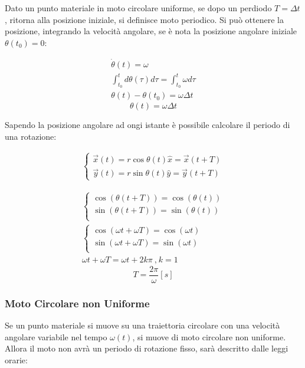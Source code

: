 \documentclass{article}
\numberwithin{equation}{subsection}
\begin{document}
Dato un punto materiale in moto circolare uniforme, se dopo un perdiodo 
$T=\Delta t$, ritorna alla posizione iniziale, si definisce moto 
periodico. Si può ottenere la posizione, integrando la velocità angolare, se è nota la posizione angolare iniziale  
$\theta(t_0) = 0$: 

\begin{gather*}
    \dot\theta(t) = \omega\\
    \int_{t_0}^{t}d\theta(\tau)d\tau=\int_{t_0}^{t}\omega d\tau\\
    \theta(t)-\theta(t_0)=\omega\Delta t
\end{gather*}
\begin{equation}
    \theta(t)=\omega\Delta t
\end{equation}

Sapendo la posizione angolare ad ongi istante è possibile 
calcolare il periodo di una rotazione:

\begin{align*}
    \begin{cases}
        \vec{x}(t)=r\cos\theta(t)\hat{x}=\vec{x}(t+T)\\
        \vec{y}(t)=r\sin\theta(t)\hat{y}=\vec{y}(t+T)
    \end{cases}
\end{align*}

\begin{gather*}
    \begin{cases}
        \cos(\theta(t+T))=\cos(\theta(t))\\
        \sin(\theta(t+T))=\sin(\theta(t))\\
    \end{cases}\\
    \begin{cases}
        \cos(\omega t +\omega T)=\cos(\omega t)\\
        \sin(\omega t + \omega T)=\sin(\omega  t)\\
    \end{cases}\\
    \omega t +\omega T =\omega t + 2k\pi\:\mbox{,}\:k=1
\end{gather*}
\begin{equation}
    T=\displaystyle\frac{2\pi}{\omega}[s]
\end{equation}

\subsubsection{Moto Circolare non Uniforme}
Se un punto materiale si muove su una traiettoria circolare con 
una velocità angolare variabile nel tempo $\omega(t)$, si muove di moto 
circolare non uniforme. Allora il moto non avrà un periodo 
di rotazione fisso, sarà descritto dalle leggi orarie:
\end{document}
